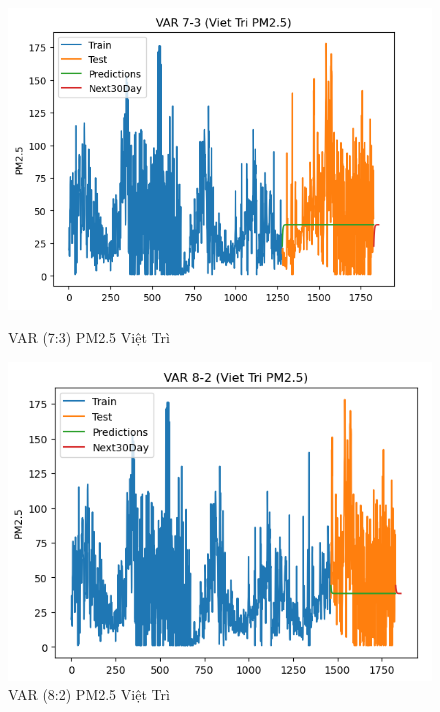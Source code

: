 \begin{figure}[h]
\begin{minipage}[b]{0.45\linewidth}
        \includegraphics[width=\linewidth]{img/VAR_7_3_VT.png}
        \caption{\scriptsize VAR (7:3) PM2.5  Việt Trì}
        \label{fig1}
    \end{minipage}\hfill
    \begin{minipage}[b]{0.45\linewidth}
        \centering
        \includegraphics[width=\linewidth]{img/VAR_8_2_Vt.png}
        \caption{\scriptsize VAR (8:2) PM2.5 Việt Trì}
        \label{fig2}
    \end{minipage}
    \centering
    \begin{minipage}[b]{0.45\linewidth}
        \centering

\end{minipage}
\end{figure}
